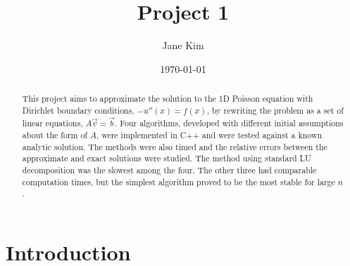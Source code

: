 \documentclass[prb,aps,twocolumn,showpacs,10pt]{revtex4-1}
\begin{document}
\title {Project 1}

\author{Jane Kim}


\date{\today}


\begin{abstract}

\noindent This project aims to approximate the solution to the 1D Poisson equation with Dirichlet boundary conditions, $-u''(x)=f(x)$, by rewriting the problem as a set of linear equations, $A\vec{v}=\vec{b}$. Four algorithms, developed with different initial assumptions about the form of $A$, were implemented in C++ and were tested against a known analytic solution. The methods were also timed and the relative errors between the approximate and exact solutions were studied. The method using standard LU decomposition was the slowest among the four. The other three had comparable computation times, but the simplest algorithm proved to be the most stable for large $n$. 

\end{abstract}



\maketitle

\section{Introduction}
\end{document}
